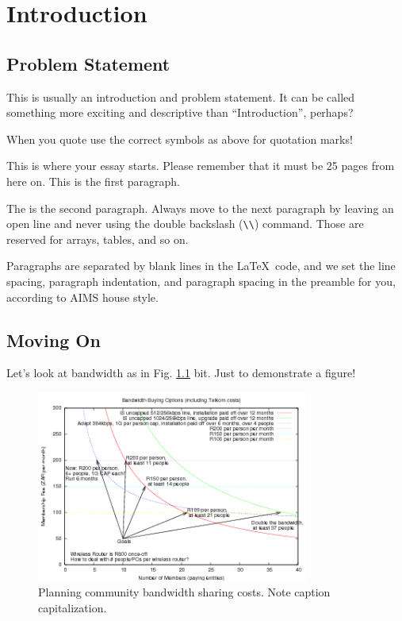 \chapter{Introduction}

\section{Problem Statement}
This is usually an introduction and problem statement. It can be called something more exciting and descriptive than ``Introduction'', perhaps? 

When you quote use the correct symbols as above for quotation marks!

This is where your essay starts. Please remember that it must be 25 pages from here on. This is the first paragraph. 

The is the second paragraph. Always move to the next paragraph by leaving an open line and never using the double backslash (\verb|\\|)
command. Those are reserved for arrays, tables, and so on.

Paragraphs are separated by blank lines in the \LaTeX\ code, and we set the line spacing, paragraph indentation,
and paragraph spacing in the preamble for you, according to AIMS house style.

\section{Moving On}
Let's look at bandwidth as in Fig. \ref{bandwidth} bit. Just to demonstrate a figure!

\begin{figure}[!h]
\centering 
\includegraphics[width=0.8\textwidth]{images/bandwidth-colour.png}
\caption{Planning community bandwidth sharing costs. 
  Note caption capitalization.}
\label{bandwidth} 
\end{figure}

